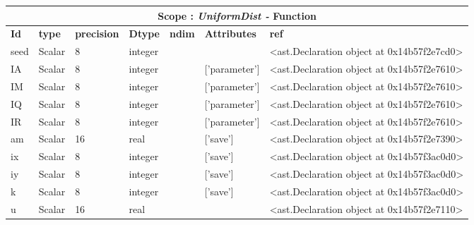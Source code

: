 \documentclass{report}
\begin{document}
\begin{center}
\begin{longtable}{|p{3.5cm}|p{1.5cm}|p{1.5cm}|p{1.5cm}|p{1cm}|p{2cm}|p{4cm}| }
\hline
\multicolumn{7}{|c|}{\textbf{Scope : \qquad}  \textbf{\textit{UniformDist - }Function}}\\ 
\hline
\textbf{Id} & \textbf{type} & \textbf{precision} & \textbf{Dtype} & \textbf{ndim} & \textbf{Attributes} & \textbf{ref} \\\hline

seed & Scalar & 8 & integer &  &  & <ast.Declaration object at 0x14b57f2e7cd0> \\\hline

IA & Scalar & 8 & integer &  & ['parameter'] & <ast.Declaration object at 0x14b57f2e7610> \\\hline

IM & Scalar & 8 & integer &  & ['parameter'] & <ast.Declaration object at 0x14b57f2e7610> \\\hline

IQ & Scalar & 8 & integer &  & ['parameter'] & <ast.Declaration object at 0x14b57f2e7610> \\\hline

IR & Scalar & 8 & integer &  & ['parameter'] & <ast.Declaration object at 0x14b57f2e7610> \\\hline

am & Scalar & 16 & real &  & ['save'] & <ast.Declaration object at 0x14b57f2e7390> \\\hline

ix & Scalar & 8 & integer &  & ['save'] & <ast.Declaration object at 0x14b57f3ac0d0> \\\hline

iy & Scalar & 8 & integer &  & ['save'] & <ast.Declaration object at 0x14b57f3ac0d0> \\\hline

k & Scalar & 8 & integer &  & ['save'] & <ast.Declaration object at 0x14b57f3ac0d0> \\\hline

u & Scalar & 16 & real &  &  & <ast.Declaration object at 0x14b57f2e7110> \\\hline

\end{longtable}
\end{center}

 \vspace{1cm}
\end{document}
